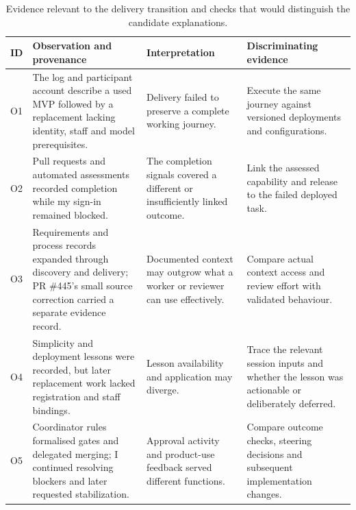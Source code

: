 \begin{table}[!htbp]
\centering\footnotesize
\caption{Evidence relevant to the delivery transition and checks that would
distinguish the candidate explanations.}\label{tab:audittrail}
\begin{tabularx}{\textwidth}{@{}L{0.7cm}L{4.7cm}YY@{}}
\toprule
ID & Observation and provenance & Interpretation & Discriminating evidence \\
\midrule
O1 & The log and participant account describe a used MVP followed by a
replacement lacking identity, staff and model prerequisites. & Delivery
failed to preserve a complete working journey. & Execute the same journey
against versioned deployments and configurations. \\
O2 & Pull requests and automated assessments recorded completion while
my sign-in remained blocked. & The completion signals covered a
different or insufficiently linked outcome. & Link the assessed capability
and release to the failed deployed task. \\
O3 & Requirements and process records expanded through discovery and delivery;
PR \#445's small source correction carried a separate evidence record. &
Documented context may outgrow what a worker or reviewer can use effectively.
& Compare actual context access and review effort with validated behaviour. \\
O4 & Simplicity and deployment lessons were recorded, but later replacement
work lacked registration and staff bindings. & Lesson availability and
application may diverge. & Trace the relevant session inputs and whether
the lesson was actionable or deliberately deferred. \\
O5 & Coordinator rules formalised gates and delegated merging; I continued
resolving blockers and later requested stabilization. & Approval
activity and product-use feedback served different functions. & Compare
outcome checks, steering decisions and subsequent implementation changes. \\
\bottomrule
\end{tabularx}
\end{table}

